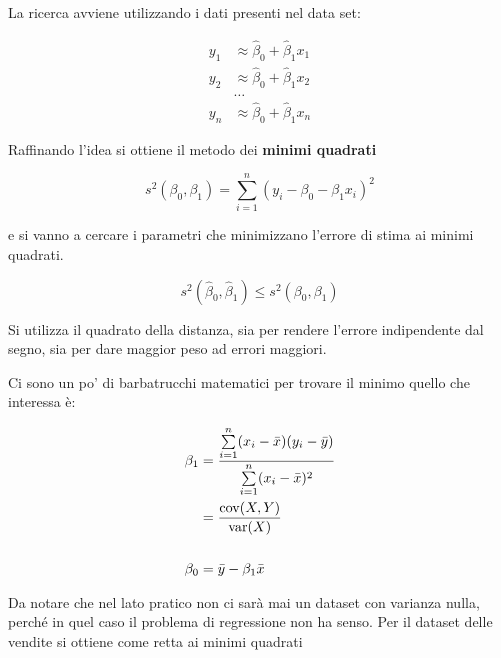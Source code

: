  La ricerca avviene utilizzando i dati presenti nel data set:


\begin{align*}
	y_1 &\approx \hat{\beta}_0 + \hat{\beta}_1 x_1 \\
	y_2 &\approx \hat{\beta}_0 + \hat{\beta}_1 x_2 \\
	&\ldots \\
	y_n &\approx \hat{\beta}_0 + \hat{\beta}_1 x_n
\end{align*}

Raffinando l'idea si ottiene il metodo dei \textbf{minimi quadrati}

$$
s^2(\beta_0, \beta_1) = \sum\limits_{i=1}^n(y_i - \beta_0 - \beta_1 x_i)^2
$$

e si vanno a cercare i parametri che minimizzano l'errore di stima
ai minimi quadrati.

$$ s^2(\hat{\beta}_0,\hat{\beta}_1) \leq s^2(\beta_0, \beta_1) $$

Si utilizza il quadrato della distanza, sia per rendere l'errore
indipendente dal segno, sia per dare maggior peso ad errori maggiori.

Ci sono un po' di barbatrucchi matematici per trovare il minimo quello
che interessa è:

\begin{align*}
	\beta_1 &= \frac{\sum\limits_{i=1}^{n} (x_i - \bar{x})(y_i - \bar{y})}{ \sum\limits_{i=1}^{n} (x_i - \bar{x})^2} \\
	 &= \frac{\text{cov}(X,Y)}{\text{var}(X)} \\
	 \: \\
	\beta_0 &= \bar{y} - \beta_1 \bar{x}
\end{align*}

Da notare che nel lato pratico non ci sarà mai un dataset con varianza
nulla, perché in quel caso il problema di regressione non ha senso. Per
il dataset delle vendite si ottiene come retta ai minimi quadrati

